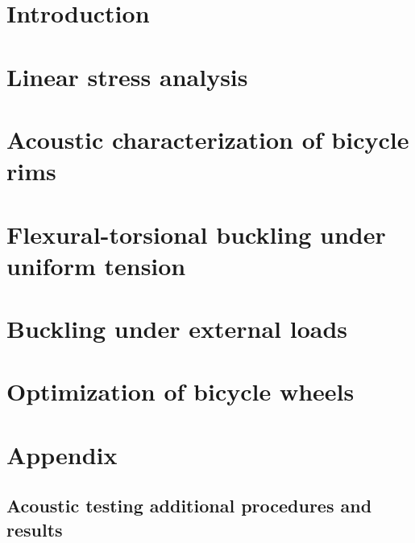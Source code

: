 \documentclass{nuthesis}
\begin{document}
\tableofcontents


\chapter{Introduction}
\label{chap:introduction}



\chapter{Linear stress analysis}
\label{chap:stress_analysis}



\chapter{Acoustic characterization of bicycle rims}
\label{chap:acoustic_testing}



\chapter{Flexural-torsional buckling under uniform tension}
\label{chap:tension_buckling}



\chapter{Buckling under external loads}
\label{chap:buckling_ext_loads}



\chapter{Optimization of bicycle wheels}
\label{chap:optimization}





\appendix

\chapter{Appendix}
\label{sec:appendix}

\section{Acoustic testing additional procedures and results}
\label{app:acoustic_testing}

\end{document}
